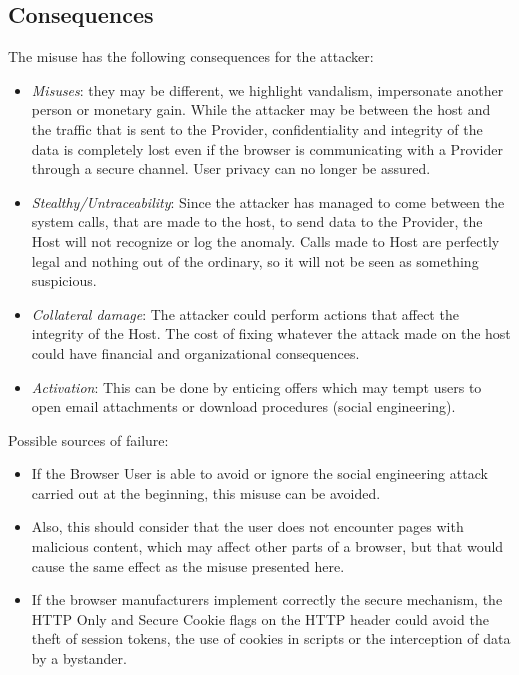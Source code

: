 \documentclass{sig-alternate-05-2015}
\begin{document}
\subsection*{Consequences}
The misuse has the following consequences for the attacker:
  \begin{itemize}
    \item \textit{Misuses}: they may be different, we highlight vandalism, impersonate another person or monetary gain. While the attacker may be between the host and the traffic that is sent to the Provider, confidentiality and integrity of the data is completely lost even if the browser is communicating with a Provider through a secure channel. User privacy can no longer be assured.
    \item \textit{Stealthy/Untraceability}: Since the attacker has managed to come between the system calls, that are made to the host, to send data to the Provider, the Host will not recognize or log the anomaly. Calls made to Host are perfectly legal and nothing out of the ordinary, so it will not be seen as something suspicious.
    \item \textit{Collateral damage}: The attacker could perform actions that affect the integrity of the Host. The cost of fixing whatever the attack made on the host could have financial and organizational consequences.
  \item \textit{Activation}: This can be done by enticing offers which may tempt users to open email attachments or download procedures (social engineering).
  \end{itemize}
  Possible sources of failure:
  \begin{itemize}
    \item If the Browser User is able to avoid or ignore the social engineering attack carried out at the beginning, this misuse can be avoided. 
    \item Also, this should consider that the user does not encounter pages with malicious content, which may affect other parts of a browser, but that would cause the same effect as the misuse presented here.
    \item If the browser manufacturers implement correctly the secure mechanism, the HTTP Only and Secure Cookie flags on the HTTP header could avoid the theft of session tokens, the use of cookies in scripts or the interception of data by a bystander.
  \end{itemize}
\end{document}
